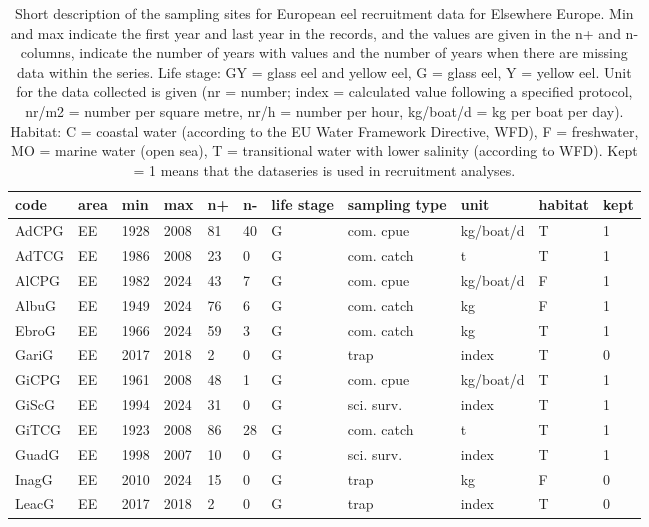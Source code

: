 \begin{table}[ht]
\centering
\caption{Short description of the sampling sites for European eel recruitment data for Elsewhere Europe. Min and max indicate the first year and last year in the records, and the values are given in the n+ and n- columns, indicate the number of years with values and the number of years when there are missing data within the series. Life stage: GY = glass eel and yellow eel, G = glass eel, Y = yellow eel. Unit for the data collected is given (nr = number; index = calculated value following a specified protocol, nr/m2 = number per square metre, nr/h = number per hour, kg/boat/d = kg per boat per day). Habitat: C = coastal water (according to the EU Water Framework Directive, WFD), F = freshwater, MO = marine water (open sea), T = transitional water with lower salinity (according to WFD). Kept = 1 means that the dataseries is used in recruitment analyses.} 
\label{statseriesG}
\begin{tabular}{p{1cm}p{1cm}p{1cm}p{1cm}p{0.8cm}p{0.8cm}p{1cm}p{2cm}p{2cm}p{1cm}p{1cm}}
  \hline
code & area & min & max & n+ & n- & life stage & sampling type & unit & habitat & kept \\ 
  \hline
AdCPG & EE & 1928 & 2008 & 81 & 40 & G & com. cpue & kg/boat/d & T & 1 \\ 
  AdTCG & EE & 1986 & 2008 & 23 & 0 & G & com. catch & t & T & 1 \\ 
  AlCPG & EE & 1982 & 2024 & 43 & 7 & G & com. cpue & kg/boat/d & F & 1 \\ 
  AlbuG & EE & 1949 & 2024 & 76 & 6 & G & com. catch & kg & F & 1 \\ 
  EbroG & EE & 1966 & 2024 & 59 & 3 & G & com. catch & kg & T & 1 \\ 
  GariG & EE & 2017 & 2018 & 2 & 0 & G & trap & index & T & 0 \\ 
  GiCPG & EE & 1961 & 2008 & 48 & 1 & G & com. cpue & kg/boat/d & T & 1 \\ 
  GiScG & EE & 1994 & 2024 & 31 & 0 & G & sci. surv. & index & T & 1 \\ 
  GiTCG & EE & 1923 & 2008 & 86 & 28 & G & com. catch & t & T & 1 \\ 
  GuadG & EE & 1998 & 2007 & 10 & 0 & G & sci. surv. & index & T & 1 \\ 
  InagG & EE & 2010 & 2024 & 15 & 0 & G & trap & kg & F & 0 \\ 
  LeacG & EE & 2017 & 2018 & 2 & 0 & G & trap & index & T & 0 \\ 

\end{tabular}
\end{table}
